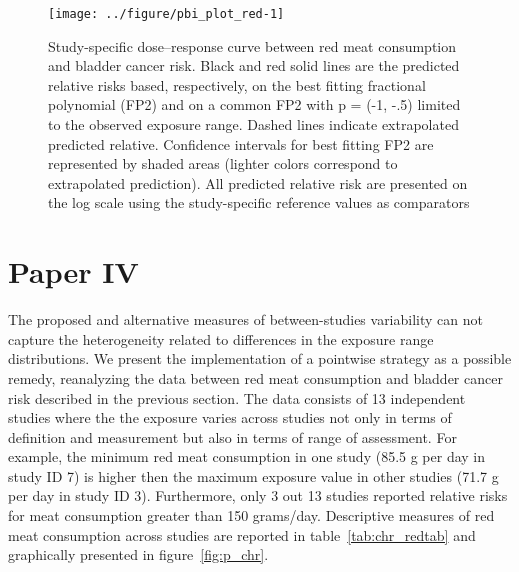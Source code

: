 \documentclass[11pt,a4paper,twoside,openany]{book}\usepackage{knitr}
\begin{document}
{\begin{knitrout}\footnotesize
{}\color{fgcolor}\begin{figure}[h]

{\centering \texttt{[image: ../figure/pbi\_plot\_red-1]} 

}

\caption[Study-specific dose--response curve between red meat consumption and bladder cancer risk]{Study-specific dose--response curve between red meat consumption and bladder cancer risk. Black and red solid lines are the predicted relative risks based, respectively, on the best fitting fractional polynomial (FP2) and on a common FP2 with p = (-1, -.5) limited to the observed exposure range. Dashed lines indicate extrapolated predicted relative. Confidence intervals for best fitting FP2 are represented by shaded areas (lighter colors correspond to extrapolated prediction). All predicted relative risk are presented on the log scale using the study-specific reference values as comparators}\label{fig:pbi_plot_red}
\end{figure}


\end{knitrout}

\clearpage

\section{Paper IV}\label{sec:res_paperIV}

\noindent The proposed and alternative measures of between-studies variability can not capture the heterogeneity related to differences in the exposure range distributions. We present the implementation of a pointwise strategy as a possible remedy, reanalyzing the data between red meat consumption and bladder cancer risk described in the previous section.
The data consists of 13 independent studies where the the exposure varies across studies not only in terms of definition and measurement but also in terms of range of assessment. For example, the minimum red meat consumption in one study (85.5 g per day in study ID 7) is higher then the maximum exposure value in other studies (71.7 g per day in study ID 3). Furthermore, only 3 out 13 studies reported relative risks for meat consumption greater than 150 grams/day. Descriptive measures of red meat consumption across studies are reported in table~\ref{tab:chr_redtab} and graphically presented in figure~\ref{fig:p_chr}.

}
\end{document}
